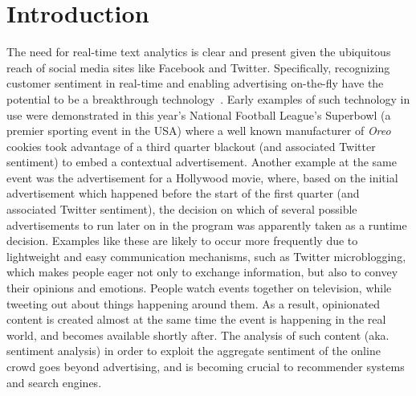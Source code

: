 \section{Introduction}

The need for real-time text analytics is clear and present given the ubiquitous reach of social media sites like Facebook and Twitter. Specifically, recognizing customer sentiment in real-time and enabling advertising on-the-fly have the potential to be a breakthrough technology~\cite{forbes}.
Early examples of such technology in use were demonstrated in this year's National Football League's Superbowl (a premier sporting event in the USA) where a well known manufacturer of {\em Oreo} cookies took advantage of a third quarter blackout (and associated Twitter sentiment) to embed a contextual advertisement. Another example at the same event was the advertisement for a Hollywood movie, where, based on the initial advertisement which happened before the start of the first quarter (and associated Twitter sentiment), the decision on which of several possible advertisements to run later on in the program was apparently taken as a runtime decision.
Examples like these are likely to occur more frequently due to
lightweight and easy communication mechanisms, such as Twitter microblogging, which makes people eager not only to exchange information, but also to convey their opinions and emotions. People watch events together on television, while tweeting out about things happening around them. As a result, opinionated content is created almost at the same time the event is happening in the real world, and becomes available shortly after.  The analysis of such content (aka. sentiment analysis) in order to exploit the aggregate sentiment of the online crowd goes beyond advertising, and is becoming crucial to recommender systems and search engines.

